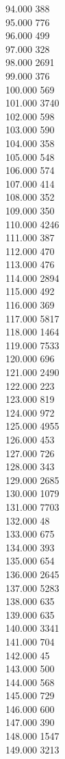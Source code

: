 { 94.000	388 \\
 95.000	776 \\
 96.000	499 \\
 97.000	328 \\
 98.000	2691 \\
 99.000	376 \\
 100.000	569 \\
 101.000	3740 \\
 102.000	598 \\
 103.000	590 \\
 104.000	358 \\
 105.000	548 \\
 106.000	574 \\
 107.000	414 \\
 108.000	352 \\
 109.000	350 \\
 110.000	4246 \\
 111.000	387 \\
 112.000	470 \\
 113.000	476 \\
 114.000	2894 \\
 115.000	492 \\
 116.000	369 \\
 117.000	5817 \\
 118.000	1464 \\
 119.000	7533 \\
 120.000	696 \\
 121.000	2490 \\
 122.000	223 \\
 123.000	819 \\
 124.000	972 \\
 125.000	4955 \\
 126.000	453 \\
 127.000	726 \\
 128.000	343 \\
 129.000	2685 \\
 130.000	1079 \\
 131.000	7703 \\
 132.000	48 \\
 133.000	675 \\
 134.000	393 \\
 135.000	654 \\
 136.000	2645 \\
 137.000	5283 \\
 138.000	635 \\
 139.000	635 \\
 140.000	3341 \\
 141.000	704 \\
 142.000	45 \\
 143.000	500 \\
 144.000	568 \\
 145.000	729 \\
 146.000	600 \\
 147.000	390 \\
 148.000	1547 \\
 149.000	3213 \\
}
